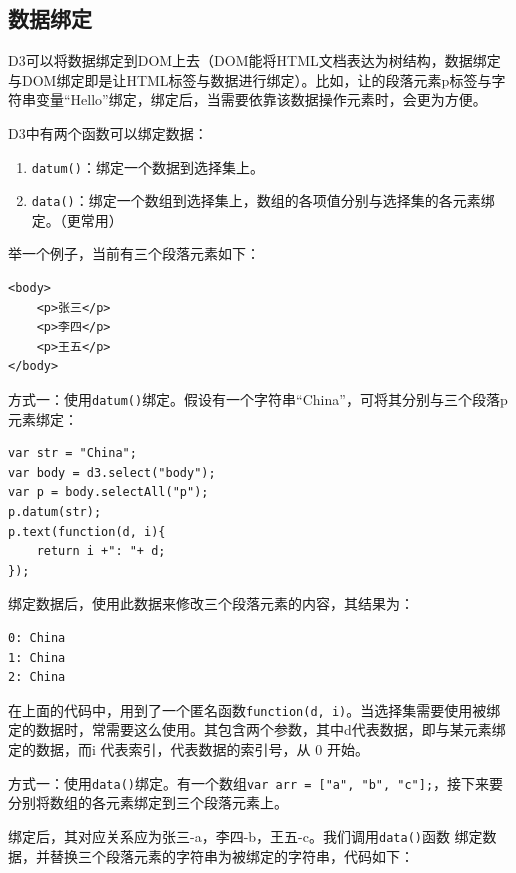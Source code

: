 \subsection{数据绑定}

D3可以将数据绑定到DOM上去（DOM能将HTML文档表达为树结构，数据绑定与DOM绑定即是让HTML标签与数据进行绑定）。比如，让的段落元素p标签与字符串变量``Hello''绑定，绑定后，当需要依靠该数据操作元素时，会更为方便。

D3中有两个函数可以绑定数据：

\begin{enumerate}
    \item \verb|datum()|：绑定一个数据到选择集上。
    \item \verb|data()|：绑定一个数组到选择集上，数组的各项值分别与选择集的各元素绑定。（更常用）
\end{enumerate}

举一个例子，当前有三个段落元素如下：

\begin{verbatim}
<body>
    <p>张三</p>
    <p>李四</p>
    <p>王五</p>
</body>
\end{verbatim}

方式一：使用\verb|datum()|绑定。假设有一个字符串``China''，可将其分别与三个段落p元素绑定：

\begin{verbatim}
var str = "China";
var body = d3.select("body");
var p = body.selectAll("p");
p.datum(str);
p.text(function(d, i){
    return i +": "+ d;
});
\end{verbatim}

绑定数据后，使用此数据来修改三个段落元素的内容，其结果为：

\begin{verbatim}
0: China
1: China
2: China
\end{verbatim}

在上面的代码中，用到了一个匿名函数\verb|function(d, i)|。当选择集需要使用被绑定的数据时，常需要这么使用。其包含两个参数，其中d代表数据，即与某元素绑定的数据，而i 代表索引，代表数据的索引号，从 0 开始。

方式一：使用\verb|data()|绑定。有一个数组\verb|var arr = ["a", "b", "c"];|，接下来要分别将数组的各元素绑定到三个段落元素上。

绑定后，其对应关系应为张三-a，李四-b，王五-c。我们调用\verb|data()|函数 绑定数据，并替换三个段落元素的字符串为被绑定的字符串，代码如下：

